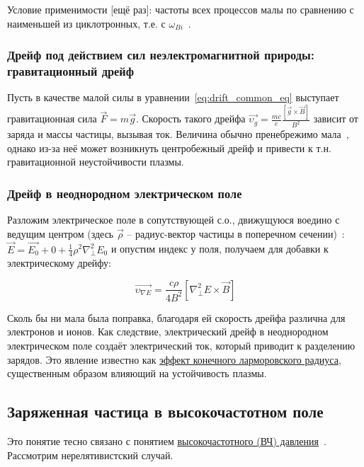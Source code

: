 \documentclass[10pt, a4paper]{article}
\begin{document}
Условие применимости [ещё раз]: частоты всех процессов малы по сравнению с наименьшей из циклотронных, т.е. с $\omega_{Bi}$~\cite{frank}.

\subsubsection{Дрейф под действием сил неэлектромагнитной природы: гравитационный дрейф}

Пусть в качестве малой силы в уравнении~\eqref{eq:drift_common_eq} выступает гравитационная сила $\vec{F}=m\vec{g}$. Скорость такого дрейфа $\overrightarrow{\upsilon_g}=\frac{mc}{e}\frac{\left[\vec{g}\times\vec{B}\right]}{B^2}$ зависит от заряда и массы частицы, вызывая ток. Величина обычно пренебрежимо мала~\cite{kotelnikov}, однако из-за неё может возникнуть центробежный дрейф и привести к т.н. гравитационной неустойчивости плазмы.

\subsubsection{Дрейф в неоднородном электрическом поле}

Разложим электрическое поле в сопутствующей с.о., движущуюся воедино с ведущим центром (здесь $\vec{\rho}$ -- радиус-вектор частицы в поперечном сечении)~\cite{kotelnikov}: $\vec{E} = \overrightarrow{E_0}+0+\frac{1}{4}\rho^2\nabla_\perp^2E_0$ и опустим индекс у поля, получаем для добавки к электрическому дрейфу:

\begin{equation*}
	\overrightarrow{\upsilon_{\nabla E}} = \frac{c\rho}{4B^2}\left[\nabla_\perp^2E\times\vec{B}\right]
\end{equation*}

Сколь бы ни мала была поправка, благодаря ей скорость дрейфа различна для
электронов и ионов. Как следствие, электрический дрейф в неоднородном электрическом поле создаёт электрический ток, который
приводит к разделению зарядов. Это явление известно как \uline{эффект
конечного ларморовского радиуса}, существенным
образом влияющий на устойчивость плазмы.

\subsection{Заряженная частица в высокочастотном поле}

Это понятие тесно связано с понятием \uline{высокочастотного (ВЧ) давления}~\cite{chen}. Рассмотрим нерелятивистский случай.
\end{document}
